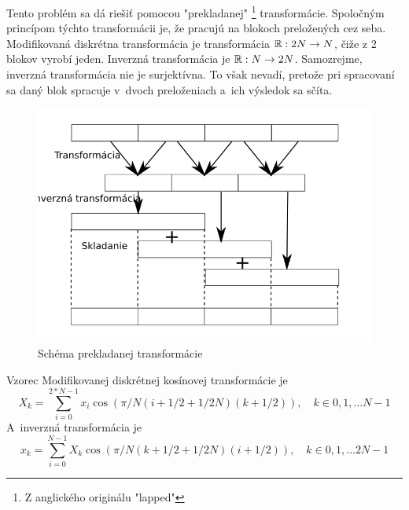 Tento problém sa dá riešiť pomocou "prekladanej" \footnote{Z
anglického originálu "lapped"} transformácie. Spoločným princípom
týchto transformácii je, že pracujú na blokoch preložených cez seba.
Modifikovaná diskrétna transformácia je transformácia ${\mathbb R}: 2N \rightarrow
N$, čiže z 2 blokov vyrobí jeden. Inverzná transformácia je
${\mathbb R}: N \rightarrow 2N$. Samozrejme, inverzná transformácia nie je
surjektívna. To však nevadí, pretože pri spracovaní sa daný blok
spracuje v~dvoch preloženiach a~ich výsledok sa sčíta.

\begin{figure}[htp]
    \centering
    \includegraphics{obrazky/informatika/audio/lapped_transform}
    \caption{Schéma prekladanej transformácie}
    \label{fig:lapped_transform}
\end{figure}

Vzorec Modifikovanej diskrétnej kosínovej transformácie je
\begin{equation*}
  X_k = \sum_{i=0}^{2*N-1} x_i 
            \cos(\pi /N (i + 1/2 + 1/2 N) (k + 1/2)),
            \quad k \in 0,1,\dots N-1
\end{equation*}
A~inverzná transformácia je
\begin{equation*}
  x_k = \sum_{i=0}^{N-1} X_k 
            \cos (\pi/N (k + 1/2 + 1/2 N) (i + 1/2)),
            \quad k \in 0,1,\dots 2N-1
\end{equation*}


